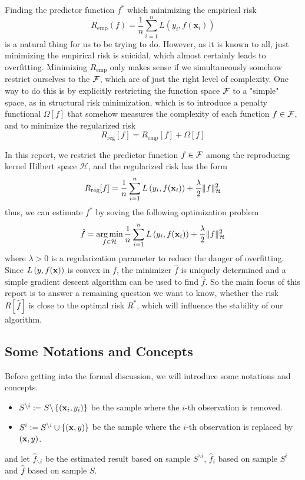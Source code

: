 Finding the predictor function $f^{*}$ which minimizing the empirical risk
\begin{equation}
	R_{\text{emp}}(f)=\frac{1}{n}\sum_{i=1}^{n}L\left(y_{i},f(\textbf{x}_{i})\right)
\end{equation}
is a natural thing for us to be trying to do. However, as it is known to all, just minimizing the empirical risk is suicidal, which almost certainly leads to overfitting. Minimizing $R_{\text{emp}}$ only makes sense if we simultaneously somehow restrict ourselves to the ${\mathcal F}$, which are of just the right level of complexity. One way to do this is by explicitly restricting the function space ${\mathcal F}$ to a "simple" space, as in structural risk minimization, which is to introduce a penalty functional $\Omega[f]$ that somehow measures the complexity of each function $f\in{\mathcal F}$, and to minimize the regularized risk
\begin{equation}
	R_{\text{reg}}[f]=R_{\text{emp}}[f]+\Omega[f]
\end{equation}

In this report, we restrict the predictor function $f\in{\mathcal F}$ among the reproducing kernel Hilbert space $\mathcal{H}$, and the regularized risk has the form
\begin{equation}
	\label{eq:regularized-risk-of-rkhs}
	R_{\text{reg}}[f]=\frac{1}{n}\sum_{i=1}^{n}L\left(y_{i},f({\bf x}_{i})\right)+\frac{\lambda}{2}\|f\|_{\mathcal{H}}^{2}
\end{equation}
thus, we can estimate $f^{*}$ by soving the following optimization problem
\begin{equation}
	\hat{f}=\underset{f\in\mathcal{H}}{\arg\min}\,\frac{1}{n}\sum_{i=1}^{n}L\left(y_{i},f({\bf x}_{i})\right)+\frac{\lambda}{2}\|f\|_{\mathcal{H}}^{2}
\end{equation}
where $\lambda>0$ is a regularization parameter to reduce the danger of overfitting. Since $L\left(y,f({\bf x})\right)$ is convex in $f$, the minimizer $\hat{f}$ is uniquely determined and a simple gradient descent algorithm can be used to find $\hat{f}$. So the main focus of this report is to answer a remaining question we want to know, whether the risk $R[\hat{f}]$ is close to the optimal risk $R^{*}$, which will influence the stability of our algorithm.

\subsection{Some Notations and Concepts}

\noindent Before getting into the formal discussion, we will introduce some notations and concepts.
\begin{itemize}
	\item $S^{\backslash i}:=S\backslash\left\{({\bf x}_{i},y_{i})\right\}$ be the sample where the $i$-th observation is removed.
	\item $S^{i}:=S^{\backslash i}\cup\{({\bf x},y)\}$ be the sample where the $i$-th observation is replaced by $({\bf x},y)$.
\end{itemize}
and let $\hat{f}_{\backslash i}$ be the estimated result based on sample $S^{\backslash i}$, $\hat{f}_{i}$ based on sample $S^{i}$ and $\hat{f}$ based on sample $S$.


